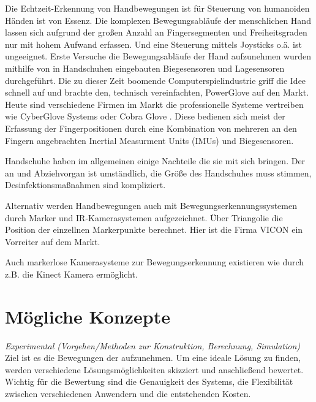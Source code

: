 \documentclass[a4paper,12pt,final]{article} %
\numberwithin{equation}{section} %
\numberwithin{figure}{section} %
\numberwithin{table}{section} %
\begin{document}
Die Echtzeit-Erkennung von Handbewegungen ist für Steuerung von humanoiden Händen ist von Essenz. Die komplexen Bewegungsabläufe der menschlichen Hand lassen sich aufgrund der großen Anzahl an Fingersegmenten und Freiheitsgraden nur mit hohem Aufwand erfassen. Und eine Steuerung mittels Joysticks o.ä. ist ungeeignet.
Erste Versuche die Bewegungsabläufe der Hand aufzunehmen wurden mithilfe von in Handschuhen eingebauten Biegesensoren \cite{FlexSensor} und Lagesensoren durchgeführt.  Die zu dieser Zeit boomende Computerspielindustrie griff die Idee schnell auf und brachte den, technisch vereinfachten, PowerGlove \cite{PowerGlove} auf den Markt. Heute sind verschiedene Firmen im Markt die professionelle Systeme vertreiben wie CyberGlove Systems \cite{CyberGlove} oder Cobra Glove \cite{CobraGlove}. Diese bedienen sich meist der Erfassung der Fingerpositionen durch eine Kombination von mehreren an den Fingern angebrachten Inertial Measurment Units (IMUs) und Biegesensoren.

Handschuhe haben im allgemeinen einige Nachteile die sie mit sich bringen. Der an und Abziehvorgan ist umständlich, die Größe des Handschuhes muss stimmen, Desinfektionsmaßnahmen sind kompliziert.

Alternativ werden Handbewegungen auch mit Bewegungserkennungssystemen durch Marker und IR-Kamerasystemen aufgezeichnet. Über Triangolie die Position der einzellnen Markerpunkte berechnet. Hier ist die Firma VICON ein Vorreiter auf dem Markt.

Auch markerlose Kamerasysteme zur Bewegungserkennung existieren wie durch z.B. die Kinect Kamera ermöglicht.


\newpage
\section{Mögliche Konzepte}
\emph{Experimental (Vorgehen/Methoden zur Konstruktion, Berechnung, Simulation)}
Ziel ist es die Bewegungen der aufzunehmen.
Um eine ideale Lösung zu finden, werden verschiedene Lösungsmöglichkeiten skizziert und anschließend bewertet.
Wichtig für die Bewertung sind die Genauigkeit des Systems, die Flexibilität zwischen verschiedenen Anwendern und die entstehenden Kosten. 
\end{document}
